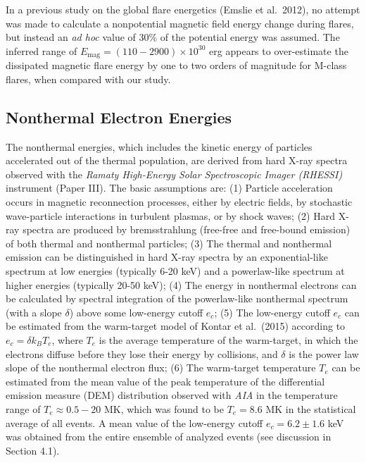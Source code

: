 \documentclass[10pt,preprint]{aastex}  %
\begin{document}
In a previous study on the global flare energetics (Emslie et al.~2012),
no attempt was made to calculate a nonpotential magnetic field
energy change during flares, but instead an {\sl ad hoc} value of 30\% of
the potential energy was assumed. The inferred range of 
$E_{\mathrm{mag}} = (110 - 2900) \times 10^{30}$ erg
appears to over-estimate the dissipated magnetic flare energy by
one to two orders of magnitude for M-class flares, when compared 
with our study. 

\subsection{		Nonthermal Electron Energies		}

The nonthermal energies, which includes the kinetic energy of particles
accelerated out of the thermal population, are derived from hard
X-ray spectra observed with the {\it Ramaty High-Energy Solar Spectroscopic
Imager (RHESSI)} instrument (Paper III). The basic assumptions are:
(1) Particle acceleration occurs in magnetic reconnection processes,
either by electric fields, by stochastic wave-particle interactions
in turbulent plasmas, or by shock waves; 
(2) Hard X-ray spectra are produced by bremsstrahlung (free-free and 
free-bound emission) of both thermal and nonthermal particles; 
(3) The thermal and nonthermal emission can be distinguished in
hard X-ray spectra by an exponential-like spectrum at low energies
(typically 6-20 keV) and a powerlaw-like spectrum at higher energies
(typically 20-50 keV);  
(4) The energy in nonthermal electrons can be calculated by spectral
integration of the powerlaw-like nonthermal spectrum (with a slope
$\delta$) above some low-energy cutoff $e_c$;
(5) The low-energy cutoff $e_c$ can be estimated from the
warm-target model of Kontar et al.~(2015) according to
$e_c = \delta k_B T_e$, where $T_e$ is the average temperature of the
warm-target, in which the electrons diffuse before they lose their energy
by collisions, and $\delta$ is the power law slope of the nonthermal
electron flux;
(6) The warm-target temperature $T_e$ can be estimated from the
mean value of the peak temperature of the differential emission measure
(DEM) distribution observed with {\it AIA} in the temperature range of
$T_e \approx 0.5-20$ MK, which was found to be $T_e=8.6$ MK 
in the statistical average of all events. 
A mean value of the low-energy cutoff $e_c=6.2 \pm 1.6$ keV
was obtained from the entire ensemble of analyzed events (see
discussion in Section 4.1). 
\end{document}
